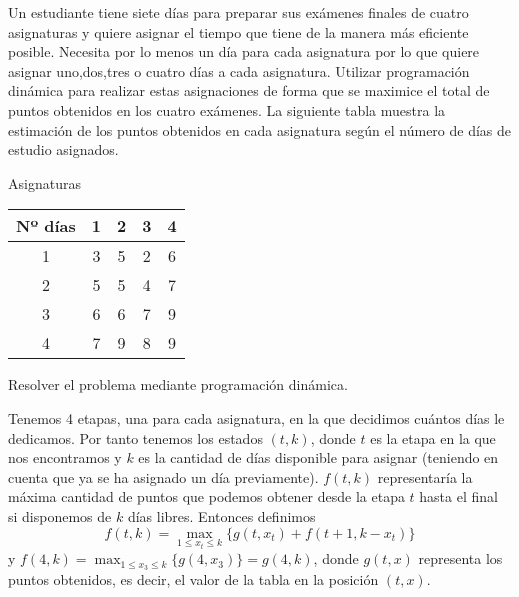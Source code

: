 \documentclass[twoside]{article}
\begin{document}
\newpage 
\begin{ejercicio}{4}
Un estudiante tiene siete días para preparar sus exámenes finales de cuatro asignaturas y
quiere asignar el tiempo que tiene de la manera más eficiente posible. Necesita por lo menos un
día para cada asignatura por lo que quiere asignar uno,dos,tres o cuatro días a cada asignatura.
Utilizar programación dinámica para realizar estas asignaciones de forma que se maximice el total
de puntos obtenidos en los cuatro exámenes. La siguiente tabla muestra la estimación de los puntos
obtenidos en cada asignatura según el número de días de estudio asignados.
\begin{center}
 Asignaturas\\
\begin{tabular}{c|c c c c}
Nº días & 1 & 2 & 3 & 4\\
\hline
1 & 3 & 5 & 2 & 6\\
2 & 5 & 5 & 4 & 7\\
3 & 6 & 6 & 7 & 9\\
4 & 7 & 9 & 8 & 9
\end{tabular}
\end{center}
Resolver el problema mediante programación dinámica.

\begin{solucion}
Tenemos 4 etapas, una para cada asignatura, en la que decidimos cuántos días le dedicamos. Por tanto tenemos los estados $(t,k)$, donde $t$ es la etapa en la que nos encontramos y $k$ es la cantidad de días disponible para asignar (teniendo en cuenta que ya se ha asignado un día previamente). $f(t,k)$ representaría la máxima cantidad de puntos que podemos obtener desde la etapa $t$ hasta el final si disponemos de $k$ días libres. Entonces definimos
$$f(t,k)=\max_{1\leq x_t\leq k}\{g(t,x_t)+f(t+1,k-x_t)\}$$ y $f(4,k)=\max_{1\leq x_3\leq k}\{g(4,x_3)\}=g(4,k)$, donde $g(t,x)$ representa los puntos obtenidos, es decir, el valor de la tabla en la posición $(t,x)$.


\end{solucion}
\end{ejercicio}
\end{document}
